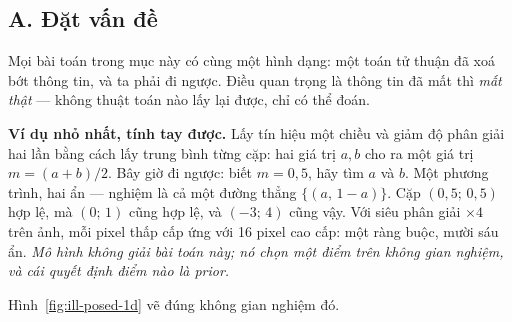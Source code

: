 \documentclass[../../../deep_learning.tex]{subfiles}
\begin{document}
\subsection{A. Đặt vấn đề}
Mọi bài toán trong mục này có cùng một hình dạng: một toán tử thuận đã xoá bớt thông tin, và ta phải đi ngược. Điều quan trọng là thông tin đã mất thì \emph{mất thật} --- không thuật toán nào lấy lại được, chỉ có thể đoán.

\textbf{Ví dụ nhỏ nhất, tính tay được.} Lấy tín hiệu một chiều và giảm độ phân giải hai lần bằng cách lấy trung bình từng cặp: hai giá trị \(a, b\) cho ra một giá trị \(m=(a+b)/2\). Bây giờ đi ngược: biết \(m=0{,}5\), hãy tìm \(a\) và \(b\). Một phương trình, hai ẩn --- nghiệm là cả một đường thẳng \(\{(a,\,1-a)\}\). Cặp \((0{,}5;\,0{,}5)\) hợp lệ, mà \((0;\,1)\) cũng hợp lệ, và \((-3;\,4)\) cũng vậy. Với siêu phân giải \(\times 4\) trên ảnh, mỗi pixel thấp cấp ứng với 16 pixel cao cấp: một ràng buộc, mười sáu ẩn. \emph{Mô hình không giải bài toán này; nó chọn một điểm trên không gian nghiệm, và cái quyết định điểm nào là prior.}

Hình~\ref{fig:ill-posed-1d} vẽ đúng không gian nghiệm đó.
\end{document}
